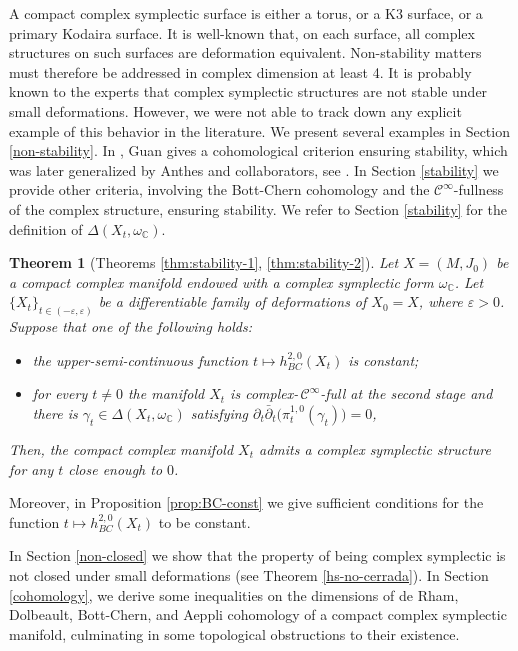 \documentclass[a4paper]{amsart}
\newtheorem{theorem}{Theorem}[section]
\theoremstyle{definition}
\theoremstyle{remark}
\numberwithin{equation}{section}
\begin{document}
A compact complex symplectic surface is either a torus, or a K3 surface, or a primary Kodaira surface. It is well-known that, on each surface, all complex structures on such surfaces are deformation equivalent. Non-stability matters must therefore be addressed in complex dimension at least 4. It is probably known to the experts that complex symplectic structures are not stable under small deformations. However, we were not able to track down any explicit example of this behavior in the literature. We present several examples in Section \ref{non-stability}. In \cite{guan}, Guan gives a cohomological criterion ensuring stability, which was later generalized by Anthes and collaborators, see \cite{anthes-cattaneo-rollenske-tomassini}. In Section \ref{stability} we provide other criteria, involving the Bott-Chern cohomology and the $\mathcal{C}^\infty$-fullness of the complex structure, ensuring stability. We refer to Section \ref{stability}  for the definition of $\Delta(X_t,\omega_{\mathbb C})$.
\begin{theorem}[Theorems \ref{thm:stability-1}, \ref{thm:stability-2}]
Let $X=(M,J_0)$ be a compact complex manifold endowed with a complex symplectic form $\omega_{\mathbb C}$. Let $\{X_t\}_{t\in(-\varepsilon,\varepsilon)}$ be a differentiable family of deformations of $X_0=X$, where $\varepsilon>0$. Suppose that one of the following holds:
\begin{itemize}
\item the upper-semi-continuous function $t\mapsto h^{2,0}_{BC}(X_t)$ is constant;
\item for every $t\neq 0$ the manifold $X_t$ is complex-\,$\mathcal C^{\infty}$-full at the second stage and there is $\gamma_t\in\Delta(X_t,\omega_{\mathbb C})$ satisfying 
$\partial_t\bar{\partial}_t\big(\pi_t^{1,0}(\gamma_t)\big)=0$,
\end{itemize}
Then, the compact complex manifold $X_t$ admits a complex symplectic structure for any $t$ close enough to $0$.
\end{theorem}
Moreover, in Proposition \ref{prop:BC-const} we give sufficient conditions for the function $t\mapsto h^{2,0}_{BC}(X_t)$ to be constant.

In Section \ref{non-closed} we show that the property of being complex symplectic is not closed under small deformations (see Theorem \ref{hs-no-cerrada}). In Section \ref{cohomology}, we derive some inequalities on the dimensions of de Rham, Dolbeault, Bott-Chern, and Aeppli cohomology of a compact complex symplectic manifold, culminating in some topological obstructions to their existence. 
\end{document}
